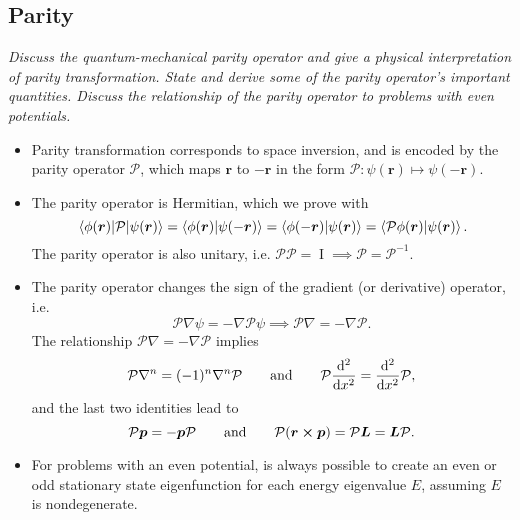 \documentclass[11pt, a4paper]{article}
\renewcommand{\grad}{\nabla}
\newcommand{\eqtext}[1]{\qquad \text{#1} \qquad}
\newcommand{\Herm}{Hermitian\xspace}
\renewcommand{\vec}[1]{\bm{#1}}  %
\renewcommand{\r}{\vec{r}}  %
\newcommand{\II}{\operatorname{I}}  %
\newcommand{\Par}{\mathcal{P}}  %
\newcommand{\p}{\psi}  %
\begin{document}
\subsection{Parity}
\textit{Discuss the quantum-mechanical parity operator and give a physical interpretation of parity transformation. State and derive some of the parity operator's important quantities. Discuss the relationship of the parity operator to problems with even potentials.}
\begin{itemize}
	\item Parity transformation corresponds to space inversion, and is encoded by the parity operator $ \Par $, which maps $ \r $ to $ -\r $ in the form $ \Par:\p(\r) \mapsto \p(-\r) $.
	
	\item The parity operator is \Herm, which we prove with
	\begin{equation*}
		\mel{\phi(\r)}{\Par}{\p(\r)} = \braket{\phi(\r)}{\p(-\r)} = \braket{\phi(-\r)}{\p(\r)} = \braket{\Par \phi(\r)}{\p(\r)}.
	\end{equation*}
	The parity operator is also unitary, i.e. $ \Par \Par = \II \implies \Par = \Par^{-1} $.

	\item The parity operator changes the sign of the gradient (or derivative) operator, i.e.
	\begin{equation*}
		\Par \grad \p = - \grad \Par \psi \implies \Par \grad = - \grad \Par.
	\end{equation*}
	The relationship $ \Par \grad = - \grad \Par $ implies
	\begin{equation*}
		\Par \grad^{n} = (-1)^{n}\grad^{n} \Par \eqtext{and} \Par \dv[2]{}{x} = \dv[2]{}{x} \Par,
	\end{equation*}
	and the last two identities lead to
	\begin{equation*}
		\Par \vec{p} = - \vec{p} \Par \eqtext{and} \Par (\r \cross \vec{p}) = \Par \vec{L} = \vec{L} \Par.
	\end{equation*}
	
	\item For problems with an even potential, is always possible to create an even or odd stationary state eigenfunction for each energy eigenvalue $ E $, assuming $ E $ is nondegenerate.

\end{itemize}
\end{document}
